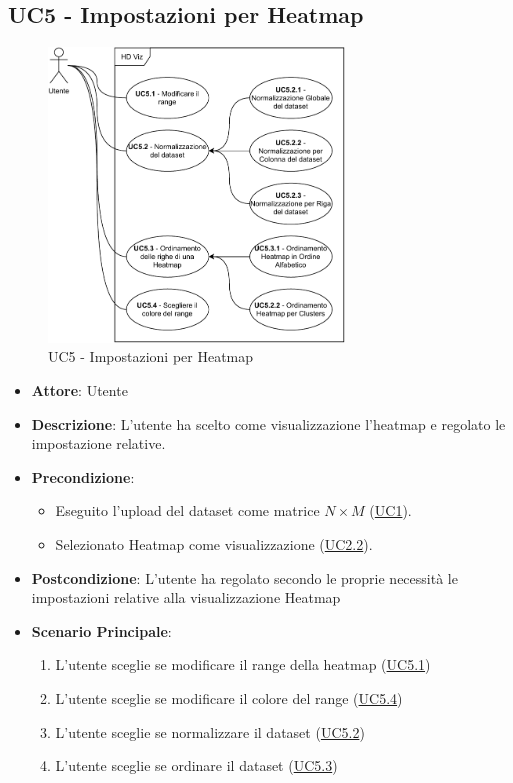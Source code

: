 \subsection{UC5 - Impostazioni per Heatmap}
    \label{uc5}
    
    \begin{figure}[htbp]
        \centering
        \includegraphics[width=0.7\textwidth]{source/sections/casi-uso/diagrams/uc5.pdf}
        \caption{UC5 - Impostazioni per Heatmap}
        \label{fig:uc5}
    \end{figure}
    
    \begin{itemize}
    \item \textbf{Attore}: Utente
    \item \textbf{Descrizione}: L'utente ha scelto come visualizzazione l'heatmap e regolato le impostazione relative.
    \item \textbf{Precondizione}: 
    \begin{itemize}
        \item Eseguito l'upload del dataset come matrice $N\times M$ (\hyperref[uc1]{UC1}).
        \item Selezionato Heatmap come visualizzazione (\hyperref[uc2.2]{UC2.2}).
    \end{itemize}  
    \item \textbf{Postcondizione}: L'utente ha regolato secondo le proprie necessità le impostazioni relative alla visualizzazione Heatmap
    \item \textbf{Scenario Principale}: 
    \begin{enumerate}
        \item L'utente sceglie se modificare il range della heatmap (\hyperref[uc5.1]{UC5.1})
        \item L'utente sceglie se modificare il colore del range (\hyperref[uc5.4]{UC5.4})
        \item L'utente sceglie se normalizzare il dataset (\hyperref[uc5.2]{UC5.2})
        \item L'utente sceglie se ordinare il dataset (\hyperref[uc5.3]{UC5.3})
    \end{enumerate}  
    \end{itemize}

